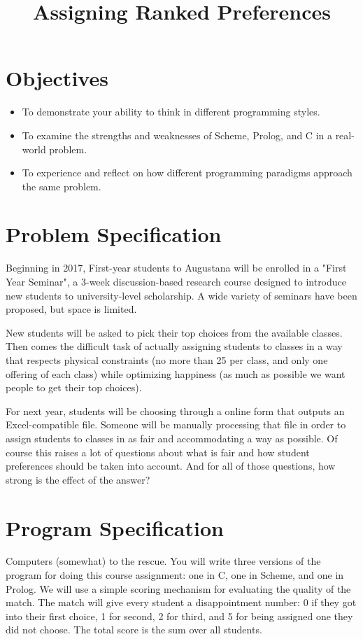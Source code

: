 \documentclass[12pt,info]{asg}
\title{Assigning Ranked Preferences}
\begin{document}
\maketitle
\section*{Objectives}
\begin{itemize}
\item To demonstrate your ability to think in different programming styles.
\item To examine the strengths and weaknesses of Scheme, Prolog, and C in a real-world problem.
\item To experience and reflect on how different programming paradigms approach the same problem.
\end{itemize}

\section*{Problem Specification}
Beginning in 2017, First-year students to Augustana will be enrolled in a "First Year Seminar", a 3-week discussion-based research course designed to introduce new students to university-level scholarship. A wide variety of seminars have been proposed, but space is limited.

New students will be asked to pick their top  choices from the available classes. Then comes the difficult task of actually assigning students to classes in a way that respects physical constraints (no more than 25 per class, and only one offering of each class) while optimizing happiness (as much as possible we want people to get their top choices).

For next year, students will be choosing through a online form that outputs an Excel-compatible file. Someone will be manually processing that file in order to assign students to classes in as fair and accommodating a way as possible. Of course this raises a lot of questions about what is fair and how student preferences should be taken into account. And for all of those questions, how strong is the effect of the answer? 

\section*{Program Specification}
Computers (somewhat) to the rescue. You will write three versions of the program for doing this course assignment: one in C, one in Scheme, and one in Prolog. We will use a simple scoring mechanism for evaluating the quality of the match. The match will give every student a disappointment number: 0 if they got into their first choice, 1 for second, 2 for third, and 5 for being assigned one they did not choose. The total score is the sum over all students. 
\end{document}
